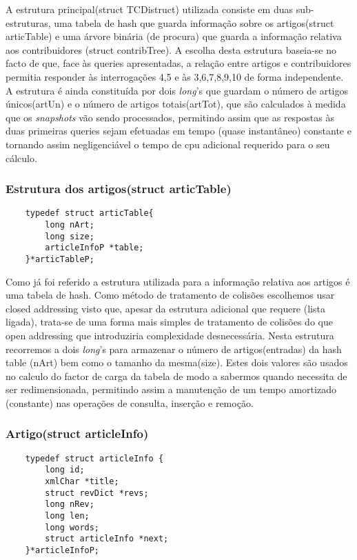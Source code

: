 \documentclass{report}
\begin{document}
A estrutura principal(struct TCDistruct) utilizada consiste em duas sub-estruturas, uma tabela de hash que guarda informação sobre os artigos(struct articTable) e uma árvore binária (de procura) que guarda a informação relativa aos contribuidores (struct contribTree). A escolha desta estrutura baseia-se no facto de que, face às queries apresentadas, a relação entre artigos e  contribuidores permitia responder às interrogações 4,5 e às 3,6,7,8,9,10 de forma independente. A estrutura é ainda constituída por dois \textit{long}'s que guardam o número de artigos únicos(artUn) e o número de artigos totais(artTot), que são calculados à medida que os \textit{snapshots} vão sendo processados, permitindo assim que as respostas às duas primeiras queries sejam efetuadas em tempo (quase instantâneo) constante e tornando assim negligenciável o tempo de cpu adicional requerido para o seu cálculo.

\subsubsection{Estrutura dos artigos(struct articTable)}
\begin{verbatim}
    typedef struct articTable{
        long nArt;
        long size;
        articleInfoP *table;
    }*articTableP;
\end{verbatim}


Como já foi referido a estrutura utilizada para a informação relativa aos artigos é uma tabela de hash. Como método de tratamento de colisões escolhemos usar closed addressing visto que, apesar da estrutura adicional que requere (lista ligada), trata-se de uma forma mais simples de tratamento de colisões do que open addressing que introduziria complexidade desnecessária.
Nesta estrutura recorremos a dois \textit{long}'s para armazenar o número de artigos(entradas) da hash table (nArt) bem como o tamanho da mesma(size). Estes dois valores são usados no calculo do factor de carga da tabela de modo a sabermos quando necessita de ser redimensionada, permitindo assim a manutenção de um tempo amortizado (constante) nas operações de consulta, inserção e remoção. 

\subsubsection{Artigo(struct articleInfo)}
\begin{verbatim}
    typedef struct articleInfo {
        long id; 
        xmlChar *title;
        struct revDict *revs;
        long nRev;
        long len;
        long words;
        struct articleInfo *next;
    }*articleInfoP;    
\end{verbatim}
\end{document}
